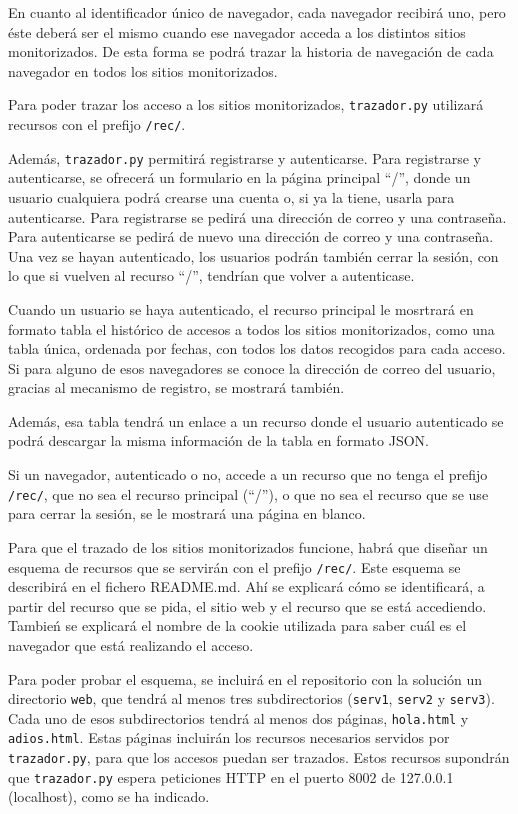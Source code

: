 En cuanto al identificador único de navegador, cada navegador recibirá uno, pero éste deberá ser el mismo cuando ese navegador acceda a los distintos sitios monitorizados. De esta forma se podrá trazar la historia de navegación de cada navegador en todos los sitios monitorizados.

Para poder trazar los acceso a los sitios monitorizados, \texttt{trazador.py} utilizará recursos con el prefijo \texttt{/rec/}.

Además, \texttt{trazador.py} permitirá registrarse y autenticarse. Para registrarse y autenticarse, se ofrecerá un formulario en la página principal ``/'', donde un usuario cualquiera podrá crearse una cuenta o, si ya la tiene, usarla para autenticarse. Para registrarse se pedirá una dirección de correo y una contraseña. Para autenticarse se pedirá de nuevo una dirección de correo y una contraseña. Una vez se hayan autenticado, los usuarios podrán también cerrar la sesión, con lo que si vuelven al recurso ``/'', tendrían que volver a autenticase.

Cuando un usuario se haya autenticado, el recurso principal le mosrtrará en formato tabla el histórico de accesos a todos los sitios monitorizados, como una tabla única, ordenada por fechas, con todos los datos recogidos para cada acceso. Si para alguno de esos navegadores se conoce la dirección de correo del usuario, gracias al mecanismo de registro, se mostrará también.

Además, esa tabla tendrá un enlace a un recurso donde el usuario autenticado se podrá descargar la misma información de la tabla en formato JSON.

Si un navegador, autenticado o no, accede a un recurso que no tenga el prefijo \texttt{/rec/}, que no sea el recurso principal (``/''), o que no sea el recurso que se use para cerrar la sesión, se le mostrará una página en blanco.

Para que el trazado de los sitios monitorizados funcione, habrá que diseñar un esquema de recursos que se servirán con el prefijo \texttt{/rec/}. Este esquema se describirá en el fichero README.md. Ahí se explicará cómo se identificará, a partir del recurso que se pida, el sitio web y el recurso que se está accediendo. Tambień se explicará el nombre de la cookie utilizada para saber cuál es el navegador que está realizando el acceso.

Para poder probar el esquema, se incluirá en el repositorio con la solución un directorio \texttt{web}, que tendrá al menos tres subdirectorios (\texttt{serv1}, \texttt{serv2} y \texttt{serv3}). Cada uno de esos subdirectorios tendrá al menos dos páginas, \texttt{hola.html} y \texttt{adios.html}. Estas páginas incluirán los recursos necesarios servidos por \texttt{trazador.py}, para que los accesos puedan ser trazados. Estos recursos supondrán que \texttt{trazador.py} espera peticiones HTTP en el puerto 8002 de 127.0.0.1 (localhost), como se ha indicado.

